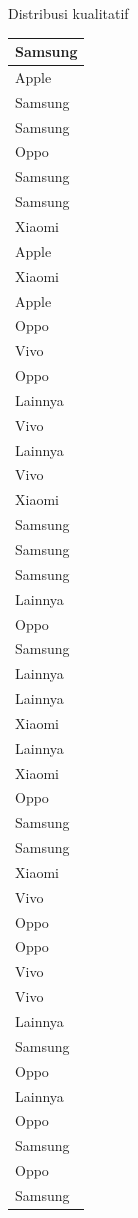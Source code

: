 \documentclass[
  ignorenonframetext,
]{beamer}
\begin{document}
\begin{frame}[s]{Distribusi kualitatif}
\begin{table}
\begin{tabular}[t]{l}
\hline
Samsung\\
\hline
Apple\\
\hline
Samsung\\
\hline
Samsung\\
\hline
Oppo\\
\hline
Samsung\\
\hline
Samsung\\
\hline
Xiaomi\\
\hline
Apple\\
\hline
Xiaomi\\
\hline
Apple\\
\hline
Oppo\\
\hline
Vivo\\
\hline
Oppo\\
\hline
Lainnya\\
\hline
Vivo\\
\hline
Lainnya\\
\hline
Vivo\\
\hline
Xiaomi\\
\hline
Samsung\\
\hline
Samsung\\
\hline
Samsung\\
\hline
Lainnya\\
\hline
Oppo\\
\hline
Samsung\\
\hline
Lainnya\\
\hline
Lainnya\\
\hline
Xiaomi\\
\hline
Lainnya\\
\hline
Xiaomi\\
\hline
Oppo\\
\hline
Samsung\\
\hline
Samsung\\
\hline
Xiaomi\\
\hline
Vivo\\
\hline
Oppo\\
\hline
Oppo\\
\hline
Vivo\\
\hline
Vivo\\
\hline
Lainnya\\
\hline
Samsung\\
\hline
Oppo\\
\hline
Lainnya\\
\hline
Oppo\\
\hline
Samsung\\
\hline
Oppo\\
\hline
Samsung\\

\end{tabular}
\end{table}
\end{frame}
\end{document}
